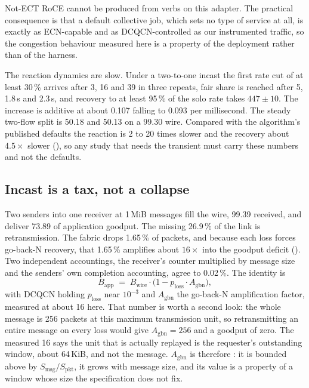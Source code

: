 Not-ECT RoCE cannot be produced from verbs on this adapter. The practical
consequence is that a default collective job, which sets no type of service at
all, is exactly as ECN-capable and as DCQCN-controlled as our instrumented
traffic, so the congestion behaviour measured here is a property of the
deployment rather than of the harness.

The reaction dynamics are slow. Under a two-to-one incast the first rate cut of
at least 30\,\% arrives after 3, 16 and 39\mS{} in three repeats, fair share is
reached after 5\mS{}, 1.8\,s and 2.3\,s, and recovery to at least 95\,\% of the
solo rate takes $447 \pm 10$\mS{}. The increase is additive at about 0.107
falling to 0.093\Gbps{} per millisecond. The steady two-flow split is 50.18 and
50.13\Gbps{} on a 99.30\Gbps{} wire. Compared with the algorithm's published
defaults the reaction is 2 to 20 times slower and the recovery about
$4.5\times$ slower (), so any study that needs the transient must
carry these numbers and not the defaults.

\subsection{Incast is a tax, not a collapse}

Two senders into one receiver at 1\,MiB messages fill the wire, 99.39\Gbps{}
received, and deliver 73.89\Gbps{} of application goodput. The missing
26.9\,\% of the link is retransmission. The fabric drops 1.65\,\% of packets,
and because each loss forces go-back-N recovery, that 1.65\,\% amplifies about
$16\times$ into the goodput deficit (). Two independent accountings,
the receiver's  counter multiplied by message size and
the senders' own completion accounting, agree to 0.02\,\%. The identity is
\begin{equation}
  B_{\text{app}} \;=\; B_{\text{wire}} \cdot
    \bigl(1 - p_{\text{loss}} \cdot A_{\text{gbn}}\bigr),
  \label{eq:incasttax}
\end{equation}
with DCQCN holding $p_{\text{loss}}$ near $10^{-3}$ and $A_{\text{gbn}}$ the
go-back-N amplification factor, measured at about 16 here. That number is worth
a second look: the whole message is 256 packets at this maximum transmission
unit, so retransmitting an entire message on every loss would give
$A_{\text{gbn}} = 256$ and a goodput of zero. The measured 16 says the unit
that is actually replayed is the requester's outstanding window, about 64\,KiB,
and not the message. $A_{\text{gbn}}$ is therefore \evcal{}: it is bounded above
by $S_{\text{msg}}/S_{\text{pkt}}$, it grows with message size, and its value
is a property of a window whose size the specification does not fix.


